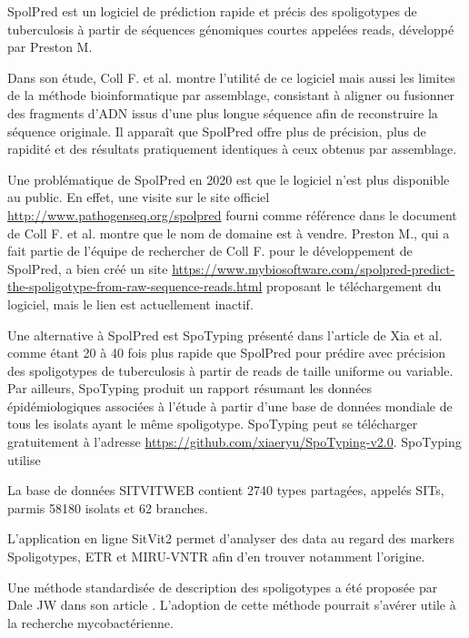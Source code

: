 \documentclass[twoside,a4paper,11pt,frenchb,openany]{report}
\begin{document}
SpolPred est un logiciel de prédiction rapide et précis des spoligotypes de tuberculosis à partir de séquences génomiques courtes appelées reads, développé par Preston M.

Dans son étude, Coll F. et al.\cite{coll} montre l'utilité de ce logiciel mais aussi les limites de la méthode bioinformatique par assemblage, consistant à aligner ou fusionner des fragments d'ADN issus d'une plus longue séquence afin de reconstruire la séquence originale. Il apparaît que SpolPred offre plus de précision, plus de rapidité et des résultats pratiquement identiques à ceux obtenus par assemblage.

Une problématique de SpolPred en 2020 est que le logiciel n'est plus disponible au public. En effet, une visite sur le site officiel \url{http://www.pathogenseq.org/spolpred} fourni comme référence dans le document \cite{coll} de Coll F. et al. montre que le nom de domaine est à vendre. Preston M., qui a fait partie de l'équipe de rechercher de Coll F. pour le développement de SpolPred, a bien créé un site \url{https://www.mybiosoftware.com/spolpred-predict-the-spoligotype-from-raw-sequence-reads.html} proposant le téléchargement du logiciel, mais le lien est actuellement inactif.

Une alternative à SpolPred est SpoTyping présenté dans l'article \cite{xia} de Xia et al. comme étant 20 à 40 fois plus rapide que SpolPred pour prédire avec précision des spoligotypes de tuberculosis à partir de reads de taille uniforme ou variable. Par ailleurs, SpoTyping produit un rapport résumant les données épidémiologiques associées à l'étude à partir d'une base de données mondiale de tous les isolats ayant le même spoligotype. SpoTyping peut se télécharger gratuitement à l'adresse \url{https://github.com/xiaeryu/SpoTyping-v2.0}.
SpoTyping utilise

La base de données SITVITWEB contient 2740 types partagées, appelés SITs, parmis 58180 isolats et 62 branches. 

L'application en ligne SitVit2 permet d'analyser des data au regard des markers Spoligotypes, ETR et MIRU-VNTR afin d'en trouver notamment l'origine.








Une méthode standardisée de description des spoligotypes a été proposée par Dale JW dans son article \cite{dale}. L'adoption de cette méthode pourrait s'avérer utile à la recherche mycobactérienne.
\end{document}
